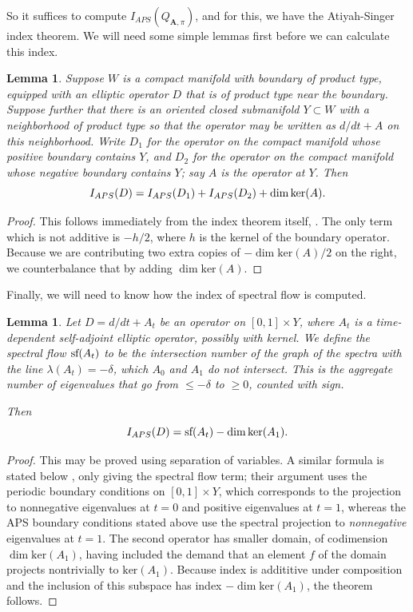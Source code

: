 \documentclass{memo-l}
\newtheorem{lemma}[theorem]{Lemma}
\theoremstyle{definition}
\theoremstyle{remark}
\numberwithin{section}{chapter}
\numberwithin{equation}{chapter}
\begin{document}
So it suffices to compute $I_{APS}(Q_{\mathbf{A},\pi})$, and for this, we have the Atiyah-Singer index theorem. We will need some simple lemmas first before we can calculate this index.

\begin{lemma}\label{APSadd}Suppose $W$ is a compact manifold with boundary of product type, equipped with an elliptic operator $D$ that is of product type near the boundary. Suppose further that there is an oriented closed submanifold $Y \subset W$ with a neighborhood of product type so that the operator may be written as $d/dt + A$ on this neighborhood. Write $D_1$ for the operator on the compact manifold whose positive boundary contains $Y$, and $D_2$ for the operator on the compact manifold whose negative boundary contains $Y$; say $A$ is the operator at $Y$. Then $$I_{APS}(D) = I_{APS}(D_1) + I_{APS}(D_2) + \dim \textup{ker}(A).$$
\end{lemma}
\begin{proof}This follows immediately from the index theorem itself, \cite[Theorem~3.10]{atiyah1975spectral}. The only term which is not additive is $-h/2$, where $h$ is the kernel of the boundary operator. Because we are contributing two extra copies of $-\dim \text{ker}(A)/2$ on the right, we counterbalance that by adding $\dim \text{ker}(A)$.
\end{proof}

Finally, we will need to know how the index of spectral flow is computed.

\begin{lemma}\label{sfindex}Let $D = d/dt + A_t$ be an operator on $[0,1] \times Y$, where $A_t$ is a time-dependent self-adjoint elliptic operator, possibly with kernel. We define the spectral flow $\textup{sf}(A_t)$ to be the intersection number of the graph of the spectra with the line $\lambda(A_t) = -\delta$, which $A_0$ and $A_1$ do not intersect. This is the aggregate number of eigenvalues that go from $\leq - \delta$ to $\geq 0$, counted with sign.

Then 
$$I_{APS}(D) = \textup{sf}(A_t) - \dim \textup{ker}(A_1).$$
\end{lemma}
\begin{proof}This may be proved using separation of variables. A similar formula is stated below \cite[Theorem~7.4]{atiyah1996spectral}, only giving the spectral flow term; their argument uses the periodic boundary conditions on $[0,1] \times Y$, which corresponds to the projection to nonnegative eigenvalues at $t = 0$ and positive eigenvalues at $t = 1$, whereas the APS boundary conditions stated above use the spectral projection to \emph{nonnegative} eigenvalues at $t=1$. The second operator has smaller domain, of codimension $\dim \text{ker}(A_1)$, having included the demand that an element $f$ of the domain projects nontrivially to $\text{ker}(A_1)$. Because index is addititive under composition and the inclusion of this subspace has index $-\dim\text{ker}(A_1)$, the theorem follows.
\end{proof}
\end{document}
